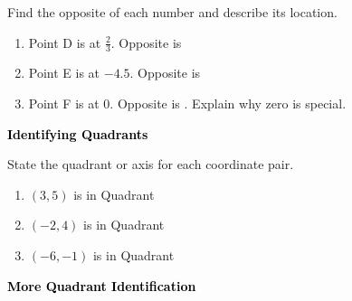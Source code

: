 \documentclass[12pt, letterpaper, fleqn]{article}
\newcommand{\blank}{\underline{\hspace{2.2cm}}}
\begin{document}
\noindent
Find the opposite of each number and describe its location.

\vspace{3mm}
\begin{enumerate}[itemsep=2.2cm, leftmargin=0.6cm]
\item Point D is at $\frac{2}{3}$. Opposite is \blank

\vspace{2cm}

\item Point E is at $-4.5$. Opposite is \blank

\vspace{2cm}

\item Point F is at $0$. Opposite is \blank. Explain why zero is special.

\vspace{2cm}

\end{enumerate}

\newpage

\begin{tcolorbox}[colback=black!10]
\large\textcolor{black}{\textbf{Identifying Quadrants}}
\end{tcolorbox}

\noindent
State the quadrant or axis for each coordinate pair.

\vspace{3mm}
\begin{enumerate}[itemsep=2.3cm, leftmargin=0.6cm]
\item $(3, 5)$ is in Quadrant \blank

\vspace{2.2cm}

\item $(-2, 4)$ is in Quadrant \blank

\vspace{2.2cm}

\item $(-6, -1)$ is in Quadrant \blank

\vspace{2.2cm}

\end{enumerate}

\newpage

\begin{tcolorbox}[colback=black!10]
\large\textcolor{black}{\textbf{More Quadrant Identification}}
\end{tcolorbox}
\end{document}
